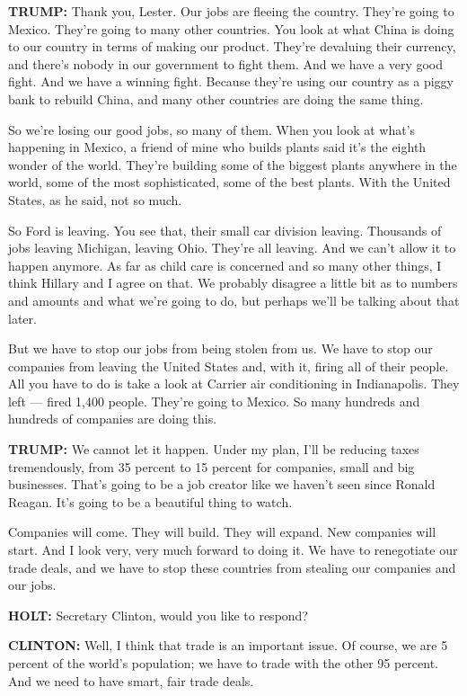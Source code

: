 \textbf{TRUMP:} Thank you, Lester. Our jobs are fleeing the country.
They're going to Mexico. They're going to many other countries. You look
at what China is doing to our country in terms of making our product.
They're devaluing their currency, and there's nobody in our government
to fight them. And we have a very good fight. And we have a winning
fight. Because they're using our country as a piggy bank to rebuild
China, and many other countries are doing the same thing.

So we're losing our good jobs, so many of them. When you look at what's
happening in Mexico, a friend of mine who builds plants said it's the
eighth wonder of the world. They're building some of the biggest plants
anywhere in the world, some of the most sophisticated, some of the best
plants. With the United States, as he said, not so much.

So Ford is leaving. You see that, their small car division leaving.
Thousands of jobs leaving Michigan, leaving Ohio. They're all leaving.
And we can't allow it to happen anymore. As far as child care is
concerned and so many other things, I think Hillary and I agree on that.
We probably disagree a little bit as to numbers and amounts and what
we're going to do, but perhaps we'll be talking about that later.

But we have to stop our jobs from being stolen from us. We have to stop
our companies from leaving the United States and, with it, firing all of
their people. All you have to do is take a look at Carrier air
conditioning in Indianapolis. They left --- fired 1,400 people. They're
going to Mexico. So many hundreds and hundreds of companies are doing
this.

\textbf{TRUMP:} We cannot let it happen. Under my plan, I'll be reducing
taxes tremendously, from 35 percent to 15 percent for companies, small
and big businesses. That's going to be a job creator like we haven't
seen since Ronald Reagan. It's going to be a beautiful thing to watch.

Companies will come. They will build. They will expand. New companies
will start. And I look very, very much forward to doing it. We have to
renegotiate our trade deals, and we have to stop these countries from
stealing our companies and our jobs.

\textbf{HOLT:} Secretary Clinton, would you like to respond?

\textbf{CLINTON:} Well, I think that trade is an important issue. Of
course, we are 5 percent of the world's population; we have to trade
with the other 95 percent. And we need to have smart, fair trade deals.

